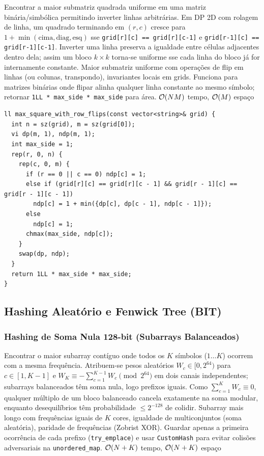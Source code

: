 \algobox
  {Encontrar a maior submatriz quadrada uniforme em uma matriz binária/simbólica permitindo inverter linhas arbitrárias.}
  {Em DP 2D com rolagem de linha, um quadrado terminando em $(r, c)$ cresce para $1 + \min(\text{cima}, \text{diag}, \text{esq})$ sse \texttt{grid[r][c] == grid[r][c-1]} e \texttt{grid[r-1][c] == grid[r-1][c-1]}.}
  {Inverter uma linha preserva a igualdade entre células adjacentes dentro dela; assim um bloco $k \times k$ torna-se uniforme sse cada linha do bloco já for internamente constante.}
  {Maior submatriz uniforme com operações de flip em linhas (ou colunas, transpondo), invariantes locais em grids.}
  {Funciona para matrizes binárias onde flipar alinha qualquer linha constante ao mesmo símbolo; retornar \texttt{1LL * max\_side * max\_side} para área.}
  {$\mathcal{O}(NM)$ tempo, $\mathcal{O}(M)$ espaço}

\begin{lstlisting}
ll max_square_with_row_flips(const vector<string>& grid) {
  int n = sz(grid), m = sz(grid[0]);
  vi dp(m, 1), ndp(m, 1);
  int max_side = 1;
  rep(r, 0, n) {
    rep(c, 0, m) {
      if (r == 0 || c == 0) ndp[c] = 1;
      else if (grid[r][c] == grid[r][c - 1] && grid[r - 1][c] == grid[r - 1][c - 1])
        ndp[c] = 1 + min({dp[c], dp[c - 1], ndp[c - 1]});
      else
        ndp[c] = 1;
      chmax(max_side, ndp[c]);
    }
    swap(dp, ndp);
  }
  return 1LL * max_side * max_side;
}
\end{lstlisting}

\subsection{Hashing Aleatório e Fenwick Tree (BIT)}

\subsubsection{Hashing de Soma Nula 128-bit (Subarrays Balanceados)}
\algobox
  {Encontrar o maior subarray contíguo onde todos os $K$ símbolos ($1 \dots K$) ocorrem com a mesma frequência.}
  {Atribuem-se pesos aleatórios $W_c \in [0, 2^{64})$ para $c \in [1, K-1]$ e $W_K \equiv -\sum_{c=1}^{K-1} W_c \pmod{2^{64}}$ em dois canais independentes; subarrays balanceados têm soma nula, logo prefixos iguais.}
  {Como $\sum_{c=1}^K W_c \equiv 0$, qualquer múltiplo de um bloco balanceado cancela exatamente na soma modular, enquanto desequilíbrios têm probabilidade $\le 2^{-128}$ de colidir.}
  {Subarray mais longo com frequências iguais de $K$ cores, igualdade de multiconjuntos (soma aleatória), paridade de frequências (Zobrist XOR).}
  {Guardar apenas a primeira ocorrência de cada prefixo (\texttt{try\_emplace}) e usar \texttt{CustomHash} para evitar colisões adversariais na \texttt{unordered\_map}.}
  {$\mathcal{O}(N + K)$ tempo, $\mathcal{O}(N + K)$ espaço}

